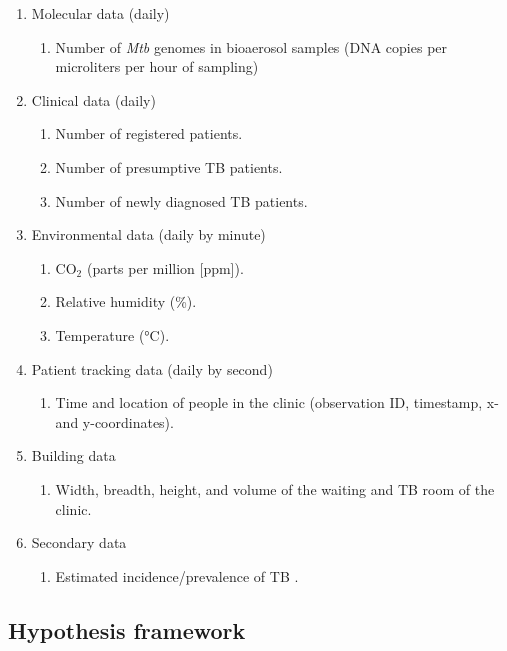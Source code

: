 \documentclass{article}
\begin{document}
\begin{enumerate}
    \item Molecular data (daily)
    \begin{enumerate}
        \item Number of \emph{Mtb} genomes in bioaerosol samples (DNA copies per microliters per hour of sampling)
    \end{enumerate}
    \item Clinical data (daily)
    \begin{enumerate}
        \item Number of registered patients.
        \item Number of presumptive TB patients.
        \item Number of newly diagnosed TB patients.
    \end{enumerate}
    \item Environmental data (daily by minute)
    \begin{enumerate}
        \item CO$_2$ (parts per million [ppm]).
        \item Relative humidity (\%).
        \item Temperature (°C).
    \end{enumerate}
    \item Patient tracking data (daily by second)
    \begin{enumerate}
        \item Time and location of people in the clinic (observation ID, timestamp, x- and y-coordinates).
    \end{enumerate}
    \item Building data
    \begin{enumerate}
        \item Width, breadth, height, and volume of the waiting and TB room of the clinic.
    \end{enumerate}
    \item Secondary data
    \begin{enumerate}
        \item Estimated incidence/prevalence of TB \cite{WHO2022TBReport}.
    \end{enumerate}
\end{enumerate}

\subsection{Hypothesis framework}
\end{document}
